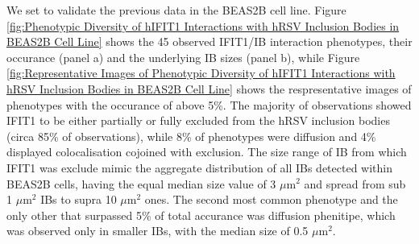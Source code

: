 We set to validate the previous data in the BEAS2B cell line. Figure \ref{fig:Phenotypic Diversity of hIFIT1 Interactions with hRSV Inclusion Bodies in BEAS2B Cell Line} shows the 45 observed IFIT1/IB interaction phenotypes, their occurance (panel a) and the underlying IB sizes (panel b), while Figure \ref{fig:Representative Images of Phenotypic Diversity of hIFIT1 Interactions with hRSV Inclusion Bodies in BEAS2B Cell Line} shows the respresentative images of phenotypes with the occurance of above 5\%. The majority of observations showed IFIT1 to be either partially or fully excluded from the hRSV inclusion bodies (circa 85\% of observations), while 8\% of phenotypes were diffusion and 4\% displayed colocalisation cojoined with exclusion. The size range of IB from which IFIT1 was exclude mimic the aggregate distribution of all IBs detected within BEAS2B cells, having the equal median size value of 3 \(\mu \mbox{m}^2\) and spread from sub 1 \(\mu \mbox{m}^2\) IBs to supra 10 \(\mu \mbox{m}^2\) ones. The second most common phenotype and the only other that surpassed 5\% of total accurance was diffusion phenitipe, which was observed only in smaller IBs, with the median size of 0.5 \(\mu \mbox{m}^2\).

